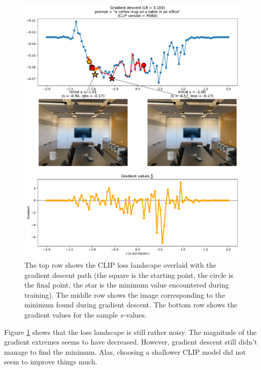 \begin{figure}[H]
    \centering
    \includegraphics[width=1.0\textwidth]{figures/3_2-room-vanilla-gd-rn50.pdf}
    \caption{The top row shows the CLIP loss landscape overlaid with the gradient descent path (the square is the starting point, the circle is the final point, the star is the minimum value encountered during training). The middle row shows the image corresponding to the minimum found during gradient descent. The bottom row shows the gradient values for the sample $s$-values.}
    \label{fig:3_2-room-vanilla-gd-rn50}
\end{figure}

Figure \ref{fig:3_2-room-vanilla-gd-rn50} shows that the loss landscape is still rather noisy. The magnitude of the gradient extremes seems to have decreased. However, gradient descent still didn't manage to find the minimum. Alas, choosing a shallower CLIP model did not seem to improve things much.

